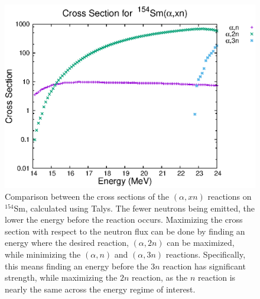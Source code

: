 \begin{figure}[t]
    \centering
    \includegraphics[scale=1]{Setup_Figs/alpha-n-comp.eps}
    \caption{Comparison between the cross sections of the $(\alpha,xn)$ reactions on $^{154}$Sm, calculated using Talys\citep{koning07:_talys}. The fewer neutrons being emitted, the lower the energy before the reaction occurs. Maximizing the cross section with respect to the neutron flux can be done by finding an energy where the desired reaction, $(\alpha,2n)$ can be maximized, while minimizing the $(\alpha,n)$ and $(\alpha,3n)$ reactions. Specifically, this means finding an energy before the $3n$ reaction has significant strength, while maximizing the $2n$ reaction, as the $n$ reaction is nearly the same across the energy regime of interest.}
    \label{fig:alpha-neutron}
\end{figure}